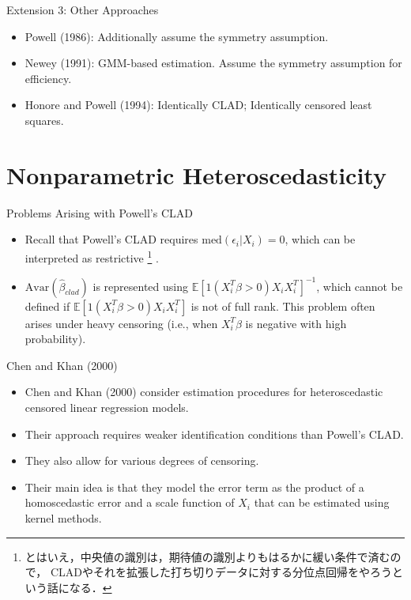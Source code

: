 \documentclass[xcolor=svgnames,dvipdfmx,cjk]{beamer}
\theoremstyle{example}
\def\Avar{\text{Avar}}
\def\med{\text{med}}
\def\E{\mathbb{E}}
\begin{document}
\begin{frame}{\alert{Extension 3}: Other Approaches}
      \begin{itemize}
            \item Powell (1986): Additionally assume the symmetry assumption.
            \item Newey (1991): GMM-based estimation. Assume the symmetry assumption for efficiency.
            \item Honore and Powell (1994): Identically CLAD; Identically censored least squares.
      \end{itemize}
\end{frame}

\section{Nonparametric Heteroscedasticity}

\begin{frame}{Problems Arising with Powell's CLAD}
      \begin{itemize}
            \item Recall that Powell's CLAD requires 
                  $\med(\epsilon_i|X_i)=0$,
                  which can be interpreted as restrictive
                  \footnote{とはいえ，中央値の識別は，期待値の識別よりもはるかに緩い条件で済むので，
                  CLADやそれを拡張した打ち切りデータに対する分位点回帰をやろうという話になる．}
                  .
            \item $\Avar(\hat{\beta}_{clad})$ is represented using 
                  $\E[1(X_i^T\beta>0)X_i X_i^T]^{-1}$,
                  which cannot be defined if $\E[1(X_i^T\beta>0)X_i X_i^T]$ is not of full rank.
                  This problem often arises under heavy censoring
                   (i.e., when $X_i^T\beta$ is negative with high probability).
      \end{itemize}
\end{frame}


\begin{frame}{Chen and Khan (2000)}
      \begin{itemize}
            \item Chen and Khan (2000) consider estimation procedures for 
                  heteroscedastic censored linear regression models.
            \item Their approach requires weaker identification conditions than Powell's CLAD.
            \item They also allow for various degrees of censoring.
            \item Their main idea is that \alert{they model the error term as the product of 
                  a homoscedastic error and a scale function of $X_i$ that can be estimated using kernel methods}.
      \end{itemize}
\end{frame}
\end{document}
